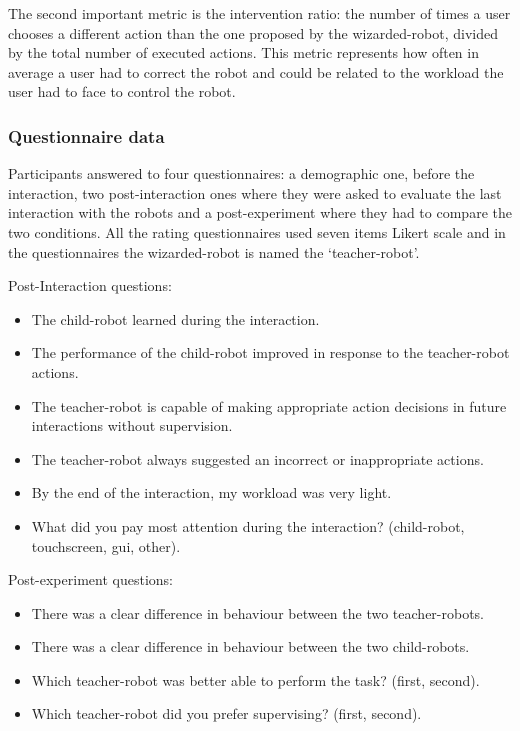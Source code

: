 The second important metric is the intervention ratio: the number of times a user chooses a different action than the one proposed by the wizarded-robot, divided by the total number of executed actions. This metric represents how often in average a user had to correct the robot and could be related to the workload the user had to face to control the robot.

\subsubsection{Questionnaire data}
 
Participants answered to four questionnaires: a demographic one, before the interaction, two post-interaction ones where they were asked to evaluate the last interaction with the robots and a post-experiment where they had to compare the two conditions. All the rating questionnaires used seven items Likert scale and in the questionnaires the wizarded-robot is named the `teacher-robot'.

Post-Interaction questions:
\begin{itemize}
	\item The child-robot learned during the interaction.
	\item The performance of the child-robot improved in response to the teacher-robot actions.
	\item The teacher-robot is capable of making appropriate action decisions in future interactions without supervision.
	\item The teacher-robot always suggested an incorrect or inappropriate actions.
	\item By the end of the interaction, my workload was very light.
	\item What did you pay most attention during the interaction? (child-robot, touchscreen, \gls{gui}, other).
\end{itemize}

Post-experiment questions:
\begin{itemize}
	\item There was a clear difference in behaviour between the two teacher-robots.
	\item There was a clear difference in behaviour between the two child-robots.
	\item Which teacher-robot was better able to perform the task? (first, second).
	\item Which teacher-robot did you prefer supervising? (first, second).
\end{itemize}

